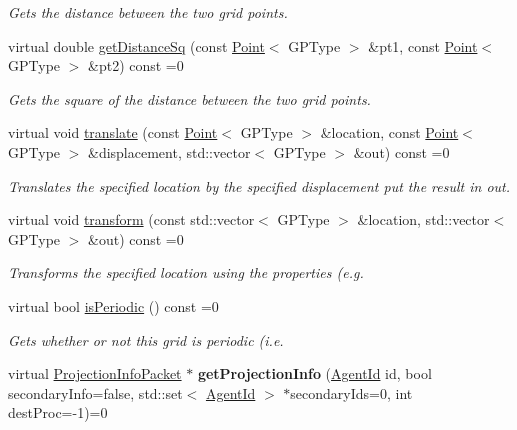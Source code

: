 \begin{DoxyCompactItemize}
\begin{DoxyCompactList}\small\item\em Gets the distance between the two grid points. \end{DoxyCompactList}\item 
virtual double \hyperlink{classrepast_1_1_grid_a456d00d28995a48b41b8f6c84817879e}{get\-Distance\-Sq} (const \hyperlink{classrepast_1_1_point}{Point}$<$ G\-P\-Type $>$ \&pt1, const \hyperlink{classrepast_1_1_point}{Point}$<$ G\-P\-Type $>$ \&pt2) const =0
\begin{DoxyCompactList}\small\item\em Gets the square of the distance between the two grid points. \end{DoxyCompactList}\item 
virtual void \hyperlink{classrepast_1_1_grid_a5aa30c315b9a32830b804d2e49af14d0}{translate} (const \hyperlink{classrepast_1_1_point}{Point}$<$ G\-P\-Type $>$ \&location, const \hyperlink{classrepast_1_1_point}{Point}$<$ G\-P\-Type $>$ \&displacement, std\-::vector$<$ G\-P\-Type $>$ \&out) const =0
\begin{DoxyCompactList}\small\item\em Translates the specified location by the specified displacement put the result in out. \end{DoxyCompactList}\item 
virtual void \hyperlink{classrepast_1_1_grid_a001bf75cd2e436112555a5f992d1d372}{transform} (const std\-::vector$<$ G\-P\-Type $>$ \&location, std\-::vector$<$ G\-P\-Type $>$ \&out) const =0
\begin{DoxyCompactList}\small\item\em Transforms the specified location using the properties (e.\-g. \end{DoxyCompactList}\item 
virtual bool \hyperlink{classrepast_1_1_grid_a81e7eb612dabbf2fb4b3f1190cd92f88}{is\-Periodic} () const =0
\begin{DoxyCompactList}\small\item\em Gets whether or not this grid is periodic (i.\-e. \end{DoxyCompactList}\item 
\hypertarget{classrepast_1_1_grid_a768c6b3b623a0b06e96321738af2da41}{virtual \hyperlink{classrepast_1_1_projection_info_packet}{Projection\-Info\-Packet} $\ast$ {\bfseries get\-Projection\-Info} (\hyperlink{classrepast_1_1_agent_id}{Agent\-Id} id, bool secondary\-Info=false, std\-::set$<$ \hyperlink{classrepast_1_1_agent_id}{Agent\-Id} $>$ $\ast$secondary\-Ids=0, int dest\-Proc=-\/1)=0}\label{classrepast_1_1_grid_a768c6b3b623a0b06e96321738af2da41}


\end{DoxyCompactItemize}
